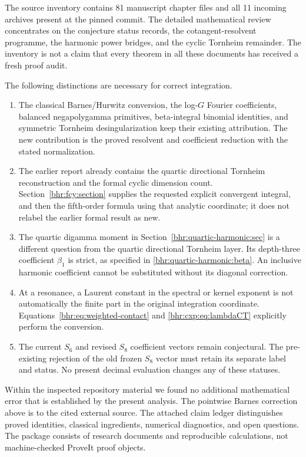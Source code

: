 The source inventory contains 81 manuscript chapter files and all
11 incoming archives present at the pinned commit. The detailed
mathematical review concentrates on the conjecture status records,
the cotangent-resolvent programme, the harmonic power bridges, and
the cyclic Tornheim remainder. The inventory is not a claim that
every theorem in all these documents has received a fresh proof audit.

The following distinctions are necessary for correct integration.
\begin{enumerate}[leftmargin=*,itemsep=5pt]
 \item The classical Barnes/Hurwitz conversion, the log-$G$ Fourier
 coefficients, balanced negapolygamma primitives, beta-integral
 binomial identities, and symmetric Tornheim desingularization keep
 their existing attribution. The new contribution is the proved
 resolvent and coefficient reduction with the stated normalization.
 \item The earlier report already contains the quartic directional
 Tornheim reconstruction and the formal cyclic dimension count.
 Section~\ref{bhr:fcy:section} supplies the requested explicit convergent
 integral, and then the fifth-order formula using that analytic
 coordinate; it does not relabel the earlier formal result as new.
 \item The quartic digamma moment in
 Section~\ref{bhr:quartic-harmonic:sec} is a different question from
 the quartic directional Tornheim layer. Its depth-three coefficient
 $\beta_1$ is strict, as specified in
 \eqref{bhr:quartic-harmonic:beta}. An inclusive harmonic coefficient
 cannot be substituted without its diagonal correction.
 \item At a resonance, a Laurent constant in the spectral or kernel
 exponent is not automatically the finite part in the original
 integration coordinate. Equations~\eqref{bhr:eq:weighted-contact}
 and \eqref{bhr:cxp:eq:lambdaCT} explicitly perform the conversion.
 \item The current $S_6$ and revised $S_8$ coefficient vectors remain
 conjectural. The pre-existing rejection of the old frozen $S_8$
 vector must retain its separate label and status. No present
 decimal evaluation changes any of these statuses.
\end{enumerate}

Within the inspected repository material we found no additional
mathematical error that is established by the present analysis.
The pointwise Barnes correction above is to the cited external
source. The attached claim ledger distinguishes proved identities,
classical ingredients, numerical diagnostics, and open questions.
The package consists of research documents and reproducible
calculations, not machine-checked ProveIt proof objects.

